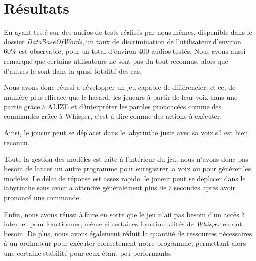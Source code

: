 \section{Résultats}
\label{sec:resultats}

En ayant testé sur des audios de tests réalisés par nous-mêmes, disponible dans le dossier \textit{DataBaseOfWords}, un taux de discrimination de l'utilisateur d'environ 60\% est observable, pour un total d'environ 400 audios testés. Nous avons aussi remarqué que certains utilisateurs ne sont pas du tout reconnus, alors que d'autres le sont dans la quasi-totalité des cas.

Nous avons donc réussi a développer un jeu capable de différencier, et ce, de manière plus efficace que le hasard, les joueurs à partir de leur voix dans une partie grâce à ALIZE et d'interpréter les paroles prononcées comme des commandes grâce à Whisper, c'est-à-dire comme des
actions à exécuter. 

Ainsi, le joueur peut se déplacer dans le labyrinthe juste avec sa voix s'l est bien reconnu. 

Toute la gestion des modèles est faite à l'intérieur du jeu, nous n'avons donc pas besoin de lancer un autre programme pour enregistrer la voix ou pour générer les modèles. 
Le délai de réponse est assez rapide, le joueur peut se déplacer dans le labyrinthe sans avoir à attendre généralement plus de 3 secondes après avoir prononcé une commande. 

Enfin, nous avons réussi à faire en sorte que le jeu n'ait pas besoin d'un accès à internet pour fonctionner, même si certaines fonctionnalités de \textit{Whisper} en ont besoin.
De plus, nous avons également réduit la quantité de ressources nécessaires à un ordinateur pour exécuter correctement notre programme, permettant alors une certaine stabilité pour ceux étant peu performants.
